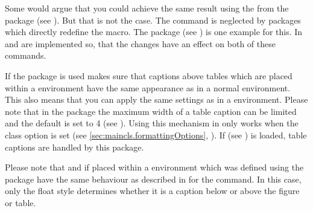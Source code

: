 \begin{Explain}
  Some would argue that you could achieve the same result using the
   from the 
  package (see \cite{package:topcapt}). But that
  is  not the case. The command  is neglected by
  packages which directly redefine the  macro. The
   package (see \cite{package:hyperref}) is one example
  for this. In \KOMAScript{}  and
   are implemented so, that the changes have an
  effect on both of these commands.
  
  If the  package is used
  \KOMAScript{} makes sure that captions above tables which are placed within
  a  environment have the same appearance as in a
  normal  environment. This also means that you can apply
  the same settings as in a  environment. Please note that
  in the  package the maximum width of a table caption can
  be limited and the default is set to 4 (see
  \cite{package:longtable}). Using \KOMAScript{} this mechanism in
   only works when the class option 
  is set (see \autoref{sec:maincls.formattingOptions},
  ). If
   (see \cite{package:caption}) is
  loaded, table captions are handled by this package.
  
  Please note that  and  if placed
  within a  environment which was defined using the
   package have the same behaviour as
  described in \cite{package:float} for the  command.  In this
  case, only the float style determines whether it is a caption below or above
  the figure or table.
\end{Explain}


